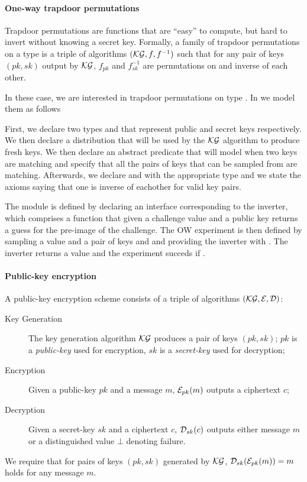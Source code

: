 \paragraph{One-way trapdoor permutations}
Trapdoor permutations are functions that are ``easy'' to compute, but
hard to invert without knowing a secret key. Formally, a family
of trapdoor permutations on a type  is a triple of algorithms
$(\mathcal{KG},f,f^{-1})$ such that for any pair of keys $(pk,sk)$ output by
$\mathcal{KG}$, $f_{pk}$ and $f^{-1}_{sk}$ are permutations on
 and inverse of each other. 

In these case, we are interested in trapdoor permutations on type
. In \EC we model them as follows


First, we declare two types  and  that represent
public and secret keys respectively. We then declare a distribution
 that will be used by the $\mathcal{KG}$ algorithm to produce fresh
keys. We then declare an abstract predicate that will model when two
keys are matching and specify that all the pairs of keys that can be
sampled from  are matching. Afterwards, we declare 
and  with the appropriate type and we state the axioms saying
that one is inverse of eachother for valid key pairs.
 
The module  is defined by declaring an interface corresponding
to the inverter, which comprises a function that given a challenge
value and a public key returns a guess for the pre-image of the
challenge. The OW experiment is then defined by sampling a value
 and a pair of keys  and  and providing the
inverter with . The inverter returns a value  and
the experiment succeds if .

\paragraph{Public-key encryption}
A public-key encryption scheme consists of a triple of algorithms
$(\mathcal{KG},\mathcal{E},\mathcal{D})$:

\begin{description}
\item[Key Generation] 
  The key generation algorithm $\mathcal{KG}$ produces a pair of keys $(pk,sk)$;
  $pk$ is a \emph{public-key} used for encryption, $sk$ is
  a \emph{secret-key} used for decryption;

\item[Encryption] 
  Given a public-key $pk$ and a message $m$, $\mathcal{E}_{pk}(m)$ outputs a
  ciphertext $c$;

\item[Decryption] 
  Given a secret-key $sk$ and a ciphertext $c$, $\mathcal{D}_{sk}(c)$ outputs
  either message $m$ or a distinguished value $\bot$ denoting failure.
\end{description}
%
We require that for pairs of keys $(pk,sk)$ generated by $\mathcal{KG}$,
$\mathcal{D}_{sk}(\mathcal{E}_{pk}(m))= m$ holds for any message $m$. 

